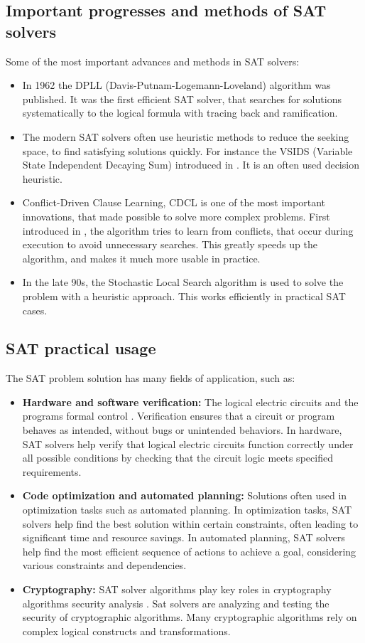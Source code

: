 \documentclass{article}
\begin{document}
\subsection{Important progresses and methods of SAT solvers}
Some of the most important advances and methods in SAT solvers:
\begin{itemize}
    \item In 1962 the DPLL (Davis-Putnam-Logemann-Loveland) algorithm was published. It was the first efficient SAT solver, that searches for solutions systematically to the logical formula with tracing back and ramification.
    \item The modern SAT solvers often use heuristic methods to reduce the seeking space, to find satisfying solutions quickly. For instance the VSIDS (Variable State Independent Decaying Sum) introduced in \cite{VSIDS}. It is an often used decision heuristic.
    \item Conflict-Driven Clause Learning, CDCL is one of the most important innovations, that made possible to solve more complex problems. First introduced in \cite{CDCL}, the algorithm tries to learn from conflicts, that occur during execution to avoid unnecessary searches. This greatly speeds up the algorithm, and makes it much more usable in practice.
    \item In the late 90s, the Stochastic Local Search algorithm is used to solve the problem with a heuristic approach. This works efficiently in practical SAT cases.
\end{itemize}

\subsection{SAT practical usage}
\label{subsec:practicaluse}
The SAT problem solution has many fields of application, such as:
\begin{itemize}
    \item \textbf{Hardware and software verification:} The logical electric circuits and the programs formal control \cite{c32SAT}. Verification ensures that a circuit or program behaves as intended, without bugs or unintended behaviors. In hardware, SAT solvers help verify that logical electric circuits function correctly under all possible conditions by checking that the circuit logic meets specified requirements.
    \item \textbf{Code optimization and automated planning:} Solutions often used in optimization tasks such as automated planning. In optimization tasks, SAT solvers help find the best solution within certain constraints, often leading to significant time and resource savings. In automated planning, SAT solvers help find the most efficient sequence of actions to achieve a goal, considering various constraints and dependencies.
    \item \textbf{Cryptography:} SAT solver algorithms play key roles in cryptography algorithms security analysis \cite{SATInCrypto}. Sat solvers are analyzing and testing the security of cryptographic algorithms. Many cryptographic algorithms rely on complex logical constructs and transformations.
\end{itemize}
\end{document}
